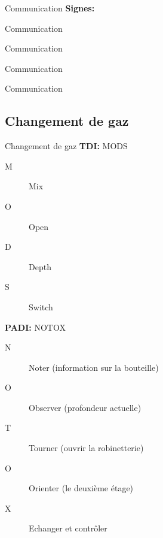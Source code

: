 \begin{frame}{Communication}  
	\textbf{Signes:}
	\vfill
\end{frame}

\begin{frame}{Communication}
	\\
\end{frame}

\begin{frame}{Communication}
	\\
\end{frame}

\begin{frame}{Communication}
\end{frame}

\begin{frame}{Communication}
	\\
\end{frame}

\subsection{Changement de gaz}

\begin{frame}{Changement de gaz}
	\textbf{TDI:} MODS
	\begin{description}
		\item[M]Mix
		\item[O]Open
		\item[D]Depth
		\item[S]Switch
	\end{description}
	\textbf{PADI:} NOTOX
	\begin{description}
		\item[N]Noter (information sur la bouteille)
		\item[O]Observer (profondeur actuelle)
		\item[T]Tourner (ouvrir la robinetterie)
		\item[O]Orienter (le deuxième étage)
		\item[X]Echanger et contrôler
	\end{description}
\end{frame}











